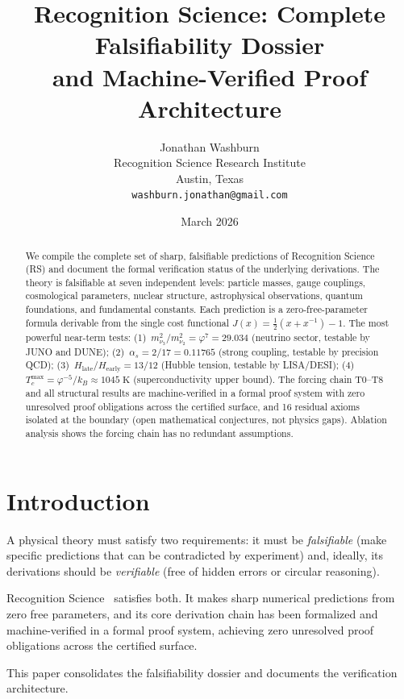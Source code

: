 \documentclass[12pt,a4paper]{article}
\title{Recognition Science: Complete Falsifiability Dossier\\
and Machine-Verified Proof Architecture}
\author{Jonathan Washburn\\
Recognition Science Research Institute\\
Austin, Texas\\
\texttt{washburn.jonathan@gmail.com}}
\date{March 2026}
\theoremstyle{definition}
\theoremstyle{remark}
\begin{document}
\maketitle

\begin{abstract}
We compile the complete set of sharp, falsifiable predictions of
Recognition Science (RS) and document the formal verification status of
the underlying derivations.  The theory is falsifiable at seven
independent levels: particle masses, gauge couplings, cosmological
parameters, nuclear structure, astrophysical observations, quantum
foundations, and fundamental constants.  Each prediction is a
zero-free-parameter formula derivable from the single cost functional
$J(x) = \tfrac{1}{2}(x + x^{-1}) - 1$.  The most powerful near-term
tests: (1)~$m_{\nu_3}^2/m_{\nu_2}^2 = \varphi^7 = 29.034$ (neutrino
sector, testable by JUNO and DUNE); (2)~$\alpha_s = 2/17 = 0.11765$
(strong coupling, testable by precision QCD); (3)~$H_{\mathrm{late}}/
H_{\mathrm{early}} = 13/12$ (Hubble tension, testable by LISA/DESI);
(4)~$T_c^{\max} = \varphi^{-5}/k_B \approx 1045\;\mathrm{K}$
(superconductivity upper bound).  The forcing chain T0--T8 and all
structural results are machine-verified in a formal proof system with
zero unresolved proof obligations across the certified surface, and 16
residual axioms isolated at the boundary (open mathematical conjectures,
not physics gaps).  Ablation analysis shows the forcing chain has no
redundant assumptions.
\end{abstract}

\section{Introduction}

A physical theory must satisfy two requirements: it must be
\emph{falsifiable} (make specific predictions that can be contradicted
by experiment) and, ideally, its derivations should be
\emph{verifiable} (free of hidden errors or circular reasoning).

Recognition Science~\cite{RS_Axioms} satisfies both.  It makes sharp
numerical predictions from zero free parameters, and its core
derivation chain has been formalized and machine-verified in a formal
proof system, achieving zero unresolved proof obligations across the
certified surface.

This paper consolidates the falsifiability dossier and documents the
verification architecture.
\end{document}
